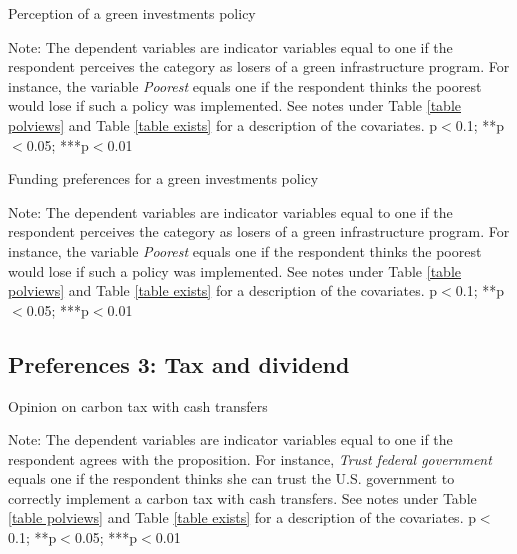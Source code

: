 \documentclass{article}
\begin{document}
\begin{table}[h!]
	\caption{Perception of a green investments policy}
	\begin{center}
		\scalebox{0.7}{}
	\end{center}
	{\footnotesize Note: The dependent variables are indicator variables equal to one if the respondent perceives the category as losers of a green infrastructure program. For instance, the variable \textit{Poorest} equals one if the respondent thinks the poorest would lose if such a policy was implemented. See notes under Table \ref{table polviews} and Table \ref{table exists} for a description of the covariates.
	\newline *p$<$0.1; **p$<$0.05; ***p$<$0.01}
\end{table}	

\begin{table}[h!]
	\caption{Funding preferences for a green investments policy}
	\begin{center}
		\scalebox{0.7}{}
	\end{center}
	{\footnotesize Note: The dependent variables are indicator variables equal to one if the respondent perceives the category as losers of a green infrastructure program. For instance, the variable \textit{Poorest} equals one if the respondent thinks the poorest would lose if such a policy was implemented. See notes under Table \ref{table polviews} and Table \ref{table exists} for a description of the covariates.
	\newline *p$<$0.1; **p$<$0.05; ***p$<$0.01}
\end{table}	



\clearpage
\subsection{Preferences 3: Tax and dividend}



\begin{table}[h!]
	\caption{Opinion on carbon tax with cash transfers}
	\begin{center}
		\scalebox{0.7}{}
	\end{center}
	{\footnotesize Note: The dependent variables are indicator variables equal to one if the respondent agrees with the proposition. For instance, \textit{Trust federal government} equals one if the respondent thinks she can trust the U.S. government to correctly implement a carbon tax with cash transfers. See notes under Table \ref{table polviews} and Table \ref{table exists} for a description of the covariates.
	\newline *p$<$0.1; **p$<$0.05; ***p$<$0.01}
\end{table}	
\end{document}
